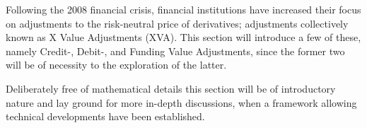 \documentclass[main.tex]{subfiles}
\begin{document}
    Following the 2008 financial crisis,
    financial institutions have increased their focus on 
    adjustments to the risk-neutral price of derivatives;
    adjustments collectively known as X Value Adjustments (XVA).
    This section will introduce a few of these, 
    namely Credit-, Debit-, and Funding Value Adjustments,
    since the former two will be of necessity to the exploration of the latter.

    Deliberately free of mathematical details this section will be of introductory nature 
    and lay ground for more in-depth discussions, 
    when a framework allowing technical developments have been established.
\end{document}
